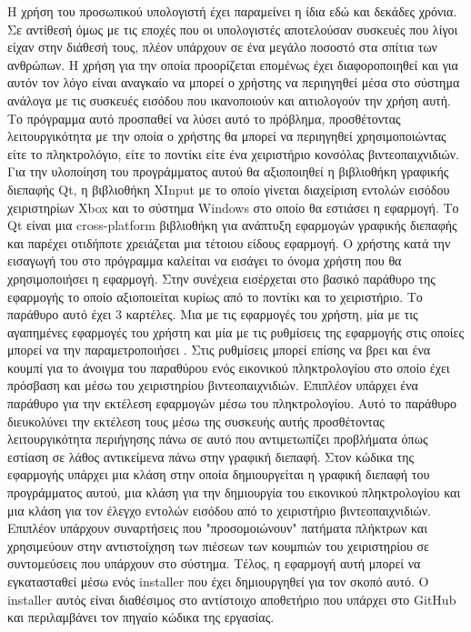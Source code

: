 






Η χρήση του προσωπικού υπολογιστή έχει παραμείνει η ίδια εδώ και δεκάδες χρόνια.
Σε αντίθεσή όμως με τις εποχές που οι υπολογιστές αποτελούσαν συσκευές που λίγοι
είχαν στην διάθεσή τους, πλέον υπάρχουν σε ένα μεγάλο ποσοστό στα σπίτια των
ανθρώπων. Η χρήση για την οποία προορίζεται επομένως έχει διαφοροποιηθεί και
για αυτόν τον λόγο είναι αναγκαίο να μπορεί ο χρήστης να περιηγηθεί μέσα στο σύστημα
ανάλογα με τις συσκευές εισόδου που ικανοποιούν και αιτιολογούν την χρήση αυτή.
Το πρόγραμμα αυτό προσπαθεί να λύσει αυτό το πρόβλημα, προσθέτοντας λειτουργικότητα
με την οποία ο χρήστης θα μπορεί να περιηγηθεί χρησιμοποιώντας είτε το πληκτρολόγιο,
είτε το ποντίκι είτε ένα χειριστήριο κονσόλας βιντεοπαιχνιδιών. Για την υλοποίηση του
προγράμματος αυτού θα αξιοποιηθεί η βιβλιοθήκη γραφικής διεπαφής Qt, η βιβλιοθήκη
XInput με το οποίο γίνεται διαχείριση εντολών εισόδου χειριστηρίων Xbox και το
σύστημα Windows στο οποίο θα εστιάσει η εφαρμογή. Το Qt είναι μια cross-platform βιβλιοθήκη
για ανάπτυξη εφαρμογών γραφικής διεπαφής και παρέχει οτιδήποτε χρειάζεται μια τέτοιου είδους εφαρμογή. Ο χρήστης κατά την εισαγωγή του
στο πρόγραμμα καλείται να εισάγει το όνομα χρήστη που θα χρησιμοποιήσει η εφαρμογή.
Στην συνέχεια εισέρχεται στο βασικό παράθυρο της εφαρμογής το οποίο αξιοποιείται κυρίως
από το ποντίκι και  το χειριστήριο. Το παράθυρο αυτό έχει 3 καρτέλες. Μια με τις εφαρμογές
του χρήστη, μία με τις αγαπημένες εφαρμογές του χρήστη και μία με τις ρυθμίσεις της εφαρμογής
στις οποίες μπορεί να την παραμετροποιήσει . Στις ρυθμίσεις μπορεί επίσης να βρει και ένα
κουμπί για το άνοιγμα του παραθύρου ενός εικονικού πληκτρολογίου στο οποίο έχει πρόσβαση και
μέσω του χειριστηρίου βιντεοπαιχνιδιών. Επιπλέον υπάρχει ένα παράθυρο για την εκτέλεση 
εφαρμογών μέσω του πληκτρολογίου. Αυτό το παράθυρο διευκολύνει την εκτέλεση τους μέσω της
συσκευής αυτής προσθέτοντας λειτουργικότητα περιήγησης πάνω σε αυτό που αντιμετωπίζει προβλήματα
όπως εστίαση σε λάθος αντικείμενα πάνω στην γραφική διεπαφή. Στον κώδικα της εφαρμογής υπάρχει
μια κλάση στην οποία δημιουργείται η γραφική διεπαφή του προγράμματος αυτού, μια κλάση για την
δημιουργία του εικονικού πληκτρολογίου και μια κλάση για τον έλεγχο εντολών εισόδου από το
χειριστήριο βιντεοπαιχνιδιών. Επιπλέον υπάρχουν συναρτήσεις που "προσομοιώνουν" πατήματα πλήκτρων
και χρησιμεύουν στην αντιστοίχηση των πιέσεων των κουμπιών του χειριστηρίου σε συντομεύσεις που
υπάρχουν στο σύστημα. Τέλος, η εφαρμογή αυτή μπορεί να εγκατασταθεί μέσω ενός installer που έχει
δημιουργηθεί για τον σκοπό αυτό. Ο installer αυτός είναι διαθέσιμος στο αντίστοιχο αποθετήριο που
υπάρχει στο GitHub και περιλαμβάνει τον πηγαίο κώδικα της εργασίας.